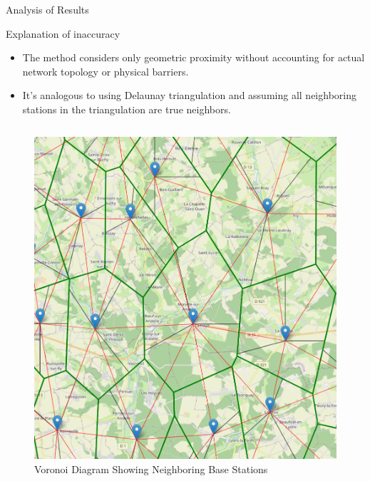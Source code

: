\begin{frame}{Analysis of Results}
    \begin{block}{Explanation of inaccuracy}
        \begin{itemize}
            \item The method considers only geometric proximity without accounting for actual network topology or physical barriers.
            \item It's analogous to using Delaunay triangulation and assuming all neighboring stations in the triangulation are true neighbors.
        \end{itemize}
    \end{block}
    \begin{columns}
        \begin{column}{0.5\paperwidth}
            \begin{figure}
                \includegraphics[height=0.3\paperheight]{images/Altair/voron-neighb.png}
                \caption{Voronoi Diagram Showing Neighboring Base Stations}
            \end{figure}
        \end{column}
        

\end{columns}
\end{frame}
